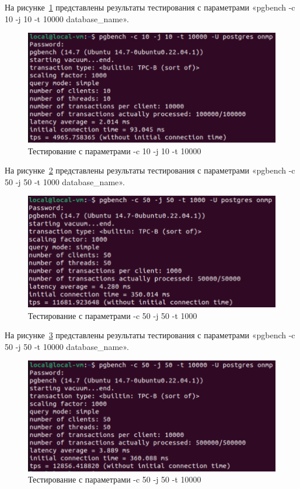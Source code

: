 На рисунке~\ref{fig:b13} представлены результаты тестирования с параметрами «pgbench -c 10 -j 10 -t 10000 database\_name».

\begin{figure}
    \includegraphics[width=16.5cm]{inc/test2_5}
    \caption{Тестирование с параметрами -c 10 -j 10 -t 10000}
    \label{fig:b13}
\end{figure}

На рисунке~\ref{fig:b14} представлены результаты тестирования с параметрами «pgbench -c 50 -j 50 -t 1000 database\_name».

\begin{figure}
    \includegraphics[width=16.5cm]{inc/test2_6}
    \caption{Тестирование с параметрами -c 50 -j 50 -t 1000}
    \label{fig:b14}
\end{figure}

На рисунке~\ref{fig:b15} представлены результаты тестирования с параметрами «pgbench -c 50 -j 50 -t 10000 database\_name».

\begin{figure}
    \includegraphics[width=16.5cm]{inc/test2_7}
    \caption{Тестирование с параметрами -c 50 -j 50 -t 10000}
    \label{fig:b15}
\end{figure}

